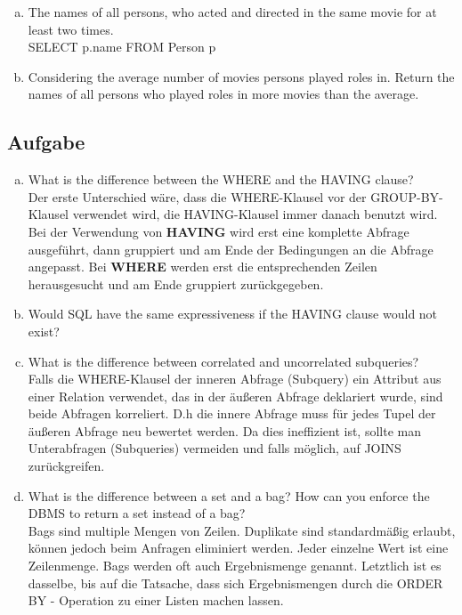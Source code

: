 \documentclass[11pt,a4paper,DIV=9]{scrartcl}
\newcounter{temp}
\newcommand{\aufgabe}[1]{
  \setcounter{temp}{\value{subsection}}
  \setcounter{subsection}{#1}
  \addtocounter{subsection}{-1}
  \subsection{Aufgabe}
  \setcounter{subsection}{\value{temp}}
}
\begin{document}
\begin{enumerate}[a.]
      \item The names of all persons, who acted and directed in the same movie for at least two times.\hfill\\ %
      SELECT p.name
      FROM Person p

      \item Considering the average number of movies persons played roles in. Return the names of all persons who played roles in more movies than the average.\hfill\\ %

    \end{enumerate}
\aufgabe{2}
\begin{enumerate}[a.]
\item What is the difference between the WHERE and the HAVING clause? \hfill\\
 Der erste Unterschied w\"are, dass die WHERE-Klausel vor der GROUP-BY-Klausel verwendet wird, die HAVING-Klausel immer danach benutzt wird. Bei der Verwendung von \textbf{HAVING} wird erst eine komplette Abfrage ausgef\"uhrt, dann gruppiert und am Ende der Bedingungen an die Abfrage angepasst. Bei \textbf{WHERE} werden erst die entsprechenden Zeilen herausgesucht und am Ende gruppiert zur\"uckgegeben.
\item Would SQL have the same expressiveness if the HAVING clause would not exist? \hfill\\
\item What is the difference between correlated and uncorrelated subqueries? \hfill\\
Falls die WHERE-Klausel der inneren Abfrage (Subquery) ein Attribut aus einer Relation verwendet, das in der \"au{\ss}eren Abfrage deklariert wurde, sind beide Abfragen korreliert. D.h die innere Abfrage muss f\"ur jedes Tupel der \"au{\ss}eren Abfrage neu bewertet werden. Da dies ineffizient ist, sollte man Unterabfragen (Subqueries) vermeiden und falls m\"oglich, auf JOINS zur\"uckgreifen.
\item What is the difference between a set and a bag? How can you enforce the DBMS to return a set instead of a bag? \\
Bags sind multiple Mengen von Zeilen. Duplikate sind standardm\"a{\ss}ig erlaubt, k\"onnen jedoch beim Anfragen eliminiert werden. Jeder einzelne Wert ist eine Zeilenmenge. Bags werden oft auch Ergebnismenge genannt. Letztlich ist es dasselbe, bis auf die Tatsache, dass sich Ergebnismengen durch die ORDER BY - Operation zu einer Listen machen lassen.

 \end{enumerate}
\end{document}
